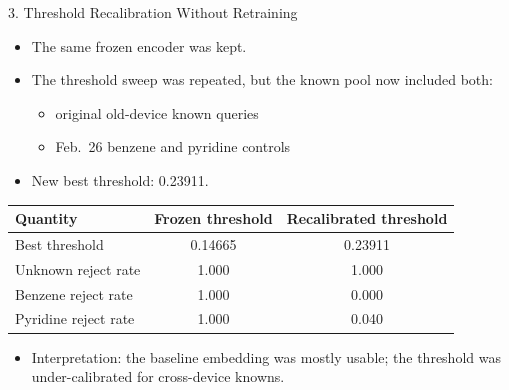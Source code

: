 \documentclass[aspectratio=169]{beamer}
\begin{document}
\begin{frame}{3. Threshold Recalibration Without Retraining}
  \begin{itemize}
    \item The same frozen encoder was kept.
    \item The threshold sweep was repeated, but the known pool now included both:
    \begin{itemize}
      \item original old-device known queries
      \item Feb.\ 26 benzene and pyridine controls
    \end{itemize}
    \item New best threshold: 0.23911.
  \end{itemize}

  \vspace{0.5em}
  \small
  \begin{tabular}{lcc}
    \toprule
    Quantity & Frozen threshold & Recalibrated threshold \\
    \midrule
    Best threshold & 0.14665 & 0.23911 \\
    Unknown reject rate & 1.000 & 1.000 \\
    Benzene reject rate & 1.000 & 0.000 \\
    Pyridine reject rate & 1.000 & 0.040 \\
    \bottomrule
  \end{tabular}

  \vspace{0.8em}
  \begin{itemize}
    \item Interpretation: the baseline embedding was mostly usable; the threshold was under-calibrated for cross-device knowns.
  \end{itemize}
\end{frame}
\end{document}
